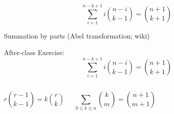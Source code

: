 \begin{frame}{}
  \[
    \sum_{i=1}^{n-k+1} i \binom{n-i}{k-1} = \binom{n+1}{k+1}
  \]

  \vspace{-0.30cm}
  \centerline{Summation by parts (Abel transformation; wiki)}
\end{frame}

\begin{frame}{}
  \begin{exampleblock}{After-class Exercise:}
    \[
      \sum_{i=1}^{n-k+1} i \binom{n-i}{k-1} = \binom{n+1}{k+1}
    \]
  \end{exampleblock}

  \begin{columns}
    \pause
    \pause
      \[
	r \binom{r-1}{k-1} = k \binom{r}{k}
      \]

      \vspace{0.60cm}
      \[
	\sum_{0 \le k \le n} \binom{k}{m} = \binom{n+1}{m+1}
      \]
  \end{columns}
\end{frame}


